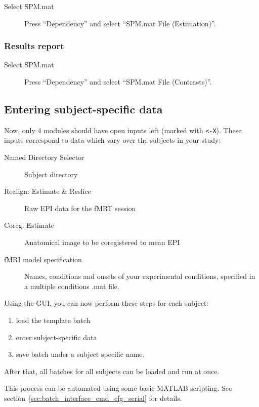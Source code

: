 \begin{description}
\item[Select SPM.mat] Press ``Dependency'' and select ``SPM.mat File
  (Estimation)''. 
\end{description}

\subsubsection*{Results report}

\begin{description}
\item[Select SPM.mat] Press ``Dependency'' and select ``SPM.mat File
  (Contrasts)''. 
\end{description}

\subsection{Entering subject-specific data}

Now, only 4 modules should have open inputs left (marked with \verb|<-X|). These
inputs correspond to data which vary over the subjects in your study:
\begin{description}
\item[Named Directory Selector] Subject directory
\item[Realign: Estimate \& Reslice] Raw EPI data for the fMRT session
\item[Coreg: Estimate] Anatomical image to be coregistered to mean EPI
\item[fMRI model specification] Names, conditions and onsets of your
  experimental conditions, specified in a multiple conditions .mat file.
\end{description}

Using the GUI, you can now perform these steps for each subject:
\begin{enumerate}
\item load the template batch
\item enter subject-specific data
\item save batch under a subject specific name.
\end{enumerate}

After that, all batches for all subjects can be loaded and run at once.

This process can be automated using some basic MATLAB scripting. See
section~\ref{sec:batch_interface_cmd_cfg_serial} for details.

